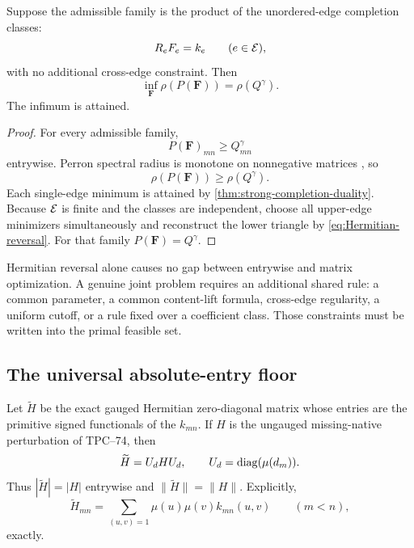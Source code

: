 \begin{theorem}
\label{thm:separated-Perron}
Suppose the admissible family is the product of the unordered-edge
completion classes:
\[
 R_eF_e=k_e\qquad(e\in\mathcal E),
\]
with no additional cross-edge constraint.  Then
\begin{equation}
 \boxed{
 \inf_{\boldsymbol F}\rho(P(\boldsymbol F))
 =
 \rho(Q^\gamma).}
 \label{eq:separated-Perron}
\end{equation}
The infimum is attained.
\end{theorem}

\begin{proof}
For every admissible family,
\[
 P(\boldsymbol F)_{mn}\ge Q^\gamma_{mn}
\]
entrywise.  Perron spectral radius is monotone on nonnegative matrices
\citep{BermanPlemmons1994}, so
\[
 \rho(P(\boldsymbol F))\ge\rho(Q^\gamma).
\]
Each single-edge minimum is attained by
\cref{thm:strong-completion-duality}.  Because \(\mathcal E\) is finite and the
classes are independent, choose all upper-edge minimizers
simultaneously and reconstruct the lower triangle by
\eqref{eq:Hermitian-reversal}.  For that family
\(P(\boldsymbol F)=Q^\gamma\).
\end{proof}

\begin{remark}
Hermitian reversal alone causes no gap between entrywise and matrix
optimization.  A genuine joint problem requires an additional shared
rule: a common parameter, a common content-lift formula, cross-edge
regularity, a uniform cutoff, or a rule fixed over a coefficient class.
Those constraints must be written into the primal feasible set.
\end{remark}

\subsection{The universal absolute-entry floor}

Let \(\widetilde H\) be the exact gauged Hermitian zero-diagonal matrix
whose entries are the primitive signed functionals of the \(k_{mn}\).
If \(H\) is the ungauged missing-native perturbation of TPC--74, then
\[
 \widetilde H=U_dHU_d,
 \qquad
 U_d=\operatorname{diag}(\mu(d_m)).
\]
Thus \(|\widetilde H|=|H|\) entrywise and
\(\|\widetilde H\|=\|H\|\).  Explicitly,
\[
 \widetilde H_{mn}
 =
 \sum_{(u,v)=1}\mu(u)\mu(v)k_{mn}(u,v)
 \qquad(m<n),
\]
exactly.

